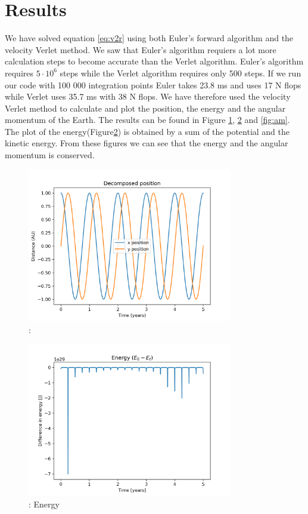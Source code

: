 \documentclass{article}
\begin{document}
\section{Results}
We have solved equation \ref{eq:v2r} using both Euler's forward algorithm and the velocity Verlet method. We saw that Euler's algorithm requiers a lot more calculation steps to become accurate than the Verlet algorithm. Euler's algorithm requires $5 \cdot 10^6$ steps while the Verlet algorithm requires only 500 steps. If we run our code with 100 000 integration points Euler takes 23.8 ms and uses 17 N flops while Verlet uses 35.7 ms with 38 N flops. We have therefore used the velocity Verlet method to calculate and plot the position, the energy and the angular momentum of the Earth. The results can be found in Figure \ref{fig:position}, \ref{fig:energy} and \ref{fig:am}. The plot of the energy(Figure\ref{fig:energy}) is obtained by a sum of the potential and the kinetic energy. From these figures we can see that the energy and the angular momentum is conserved.

\begin{figure}[H]
    \begin{center}
        \includegraphics[width=0.8\textwidth]{./Plot/xy_vs_time.png}
        \caption{: }
        \label{fig:position}
    \end{center}
\end{figure}

\begin{figure}[H]
    \begin{center}
        \includegraphics[width=0.8\textwidth]{./Plot/energy.png}
        \caption{: Energy}
        \label{fig:energy}
    \end{center}
\end{figure}
\end{document}
